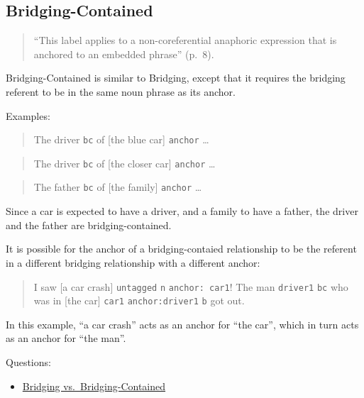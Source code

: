 \documentclass[
]{book}
\providecommand{\tightlist}{%
  \setlength{\itemsep}{0pt}\setlength{\parskip}{0pt}}
\begin{document}
\hypertarget{bridging-contained}{%
\subsection{Bridging-Contained}\label{bridging-contained}}

\begin{quote}
``This label applies to a non-coreferential anaphoric expression that is anchored to an embedded phrase'' (p.~8).
\end{quote}

Bridging-Contained is similar to Bridging, except that it requires the bridging referent to be in the same noun phrase as its anchor.

Examples:

\begin{quote}
The driver \texttt{bc} of {[}the blue car{]} \texttt{anchor} \ldots{}
\end{quote}

\begin{quote}
The driver \texttt{bc} of {[}the closer car{]} \texttt{anchor} \ldots{}
\end{quote}

\begin{quote}
The father \texttt{bc} of {[}the family{]} \texttt{anchor} \ldots{}
\end{quote}

Since a car is expected to have a driver, and a family to have a father,
the driver and the father are bridging-contained.

It is possible for the anchor of a bridging-contaied relationship to be the referent in a different bridging relationship
with a different anchor:

\begin{quote}
I saw {[}a car crash{]} \texttt{untagged} \texttt{n} \texttt{anchor:\ car1}!
The man \texttt{driver1} \texttt{bc} who was in {[}the car{]} \texttt{car1} \texttt{anchor:driver1} \texttt{b} got out.
\end{quote}

In this example, ``a car crash'' acts as an anchor for ``the car'',
which in turn acts as an anchor for ``the man''.

Questions:

\begin{itemize}
\tightlist
\item
  \protect\hyperlink{bridging-vs.-bridging-contained}{Bridging vs.~Bridging-Contained}
\end{itemize}
\end{document}
